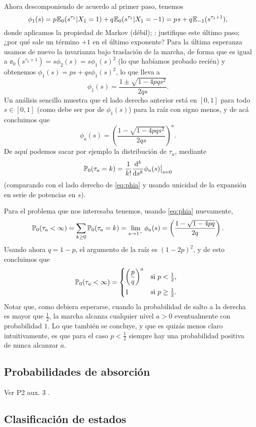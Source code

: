 Ahora descomponiendo de acuerdo al primer paso, tenemos
\[\phi_1(s)=p\hspace{0.05em}\mathbb{E}_0(s^{\tau_1}|X_1=1)+q\hspace{0.05em}\mathbb{E}_0(s^{\tau_1}|X_1=-1)=p\hspace{0.05em} s+q\hspace{0.05em}\mathbb{E}_{-1}(s^{\tau_1+1}),\]
donde aplicamos la propiedad de Markov (débil); \uexers: justifique este último paso; ¿por qué sale un término $+1$ en el último exponente?
Para la última esperanza usamos de nuevo la invarianza bajo traslación de la marcha, de forma que es igual a $\ee_{0}(s^{\tau_2+1})=s\phi_2(s)=s\phi_1(s)^2$ (lo que habíamos probado recién) y obtenemos $\phi_1(s)=ps+qs\phi_1(s)^2$, lo que lleva a 
\[\phi_1(s)=\frac{1\pm\sqrt{1-4pqs^2}}{2qs}.\]
Un análisis sencillo muestra que el lado derecho anterior está en $[0,1]$ para todo $s\in[0,1]$ (como debe ser por de $\phi_1(s)$) para la raíz con signo menos, y de acá concluimos que
\[\phi_a(s)=\left(\frac{1-\sqrt{1-4pqs^2}}{2qs}\right)^a.\]
De aquí podemos sacar por ejemplo la distribución de $\tau_a$, mediante
\[\mathbb{P}_0(\tau_a=k)=\frac{1}{k!}\frac{\mathrm{d}^k}{\mathrm{d} s^k}\phi_a(s)\big|_{s=0}\]
(comparando con el lado derecho de \eqref{eq:phia} y usando unicidad de la expansión en serie de potencias en $s$).

Para el problema que nos interesaba tenemos, usando \eqref{eq:phia} nuevamente,
\[\mathbb{P}_0(\tau_a<\infty)=\sum_{k\geq0}\mathbb{P}_0(\tau_a=k)=\lim_{s\to1^-}\phi_a(s)=\left(\frac{1-\sqrt{1-4pq}}{2q}\right).\]
Usando ahora $q=1-p$, el argumento de la raíz es $(1-2p)^2$, y de esto concluimos que
\[\pp_0(\tau_a<\infty)=
\begin{dcases*}
\left(\frac{p}{q}\right)^a & si $p<\tfrac12$,\\
1 & si $p\geq\tfrac12$.
\end{dcases*}\]
Notar que, como debiera esperarse, cuando la probabilidad de salto a la derecha es mayor que $\frac12$, la marcha alcanza cualquier nivel $a>0$ eventualmente con probabilidad $1$.
Lo que también se concluye, y que es quizás menos claro intuitivamente, es que para el caso $p<\frac12$ siempre hay una probabilidad positiva de nunca alcanzar $a$.

\subsection{Probabilidades de absorción}

Ver P2 aux. 3 \ucmark.

\subsection{Clasificación de estados}

